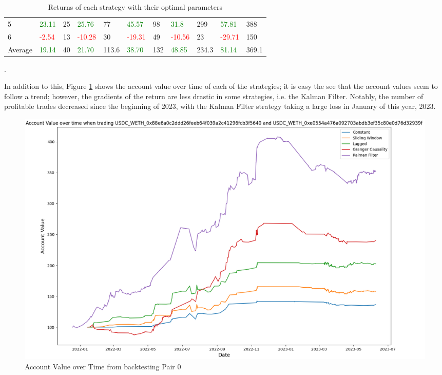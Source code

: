 \begin{table}[H]
\begin{adjustwidth}{-0.8in}{-0.9in}
\begin{tabular}{|p{4em}|p{3em}|p{3em}|p{3em}|p{3em}|p{3em}|p{3em}|p{3em}|p{3em}|p{3em}|p{3em}|}
            5 & \textcolor{green}{23.11} & 25 & \textcolor{green}{25.76} & 77 & \textcolor{green}{45.57} & 98 & \textcolor{green}{31.8} & 299 & \textcolor{green}{57.81} & 388\\\cline{2-11}
            6 & \textcolor{red}{-2.54} & 13 & \textcolor{red}{-10.28} & 30 & \textcolor{red}{-19.31} & 49 & \textcolor{red}{-10.56} & 23 & \textcolor{red}{-29.71} & 150\\\hline\hline           
            Average & \textcolor{green}{19.14} & 40 & \textcolor{green}{21.70} & 113.6 & \textcolor{green}{38.70} & 132 & \textcolor{green}{48.85} & 234.3 & \textcolor{green}{81.14} & 369.1\\\hline                       
        \end{tabular}
    \end{adjustwidth}
    \caption{Returns of each strategy with their optimal parameters \label{tab:FinalResults}}.
\end{table}

\noindent In addition to this, Figure \ref{fig:ValueHistory} shows the account value over time of each of the strategies; it is easy the see that the account values seem to follow a trend; however, the gradients of the return are less drastic in some strategies, i.e. the Kalman Filter. Notably, the number of profitable trades decreased since the beginning of 2023, with the Kalman Filter strategy taking a large loss in January of this year, 2023.

\begin{figure}[H]
    \centering
    \includegraphics[width=\linewidth]{evaluation/Images/ValueHistory.png}
    \caption{Account Value over Time from backtesting Pair 0}
    \label{fig:ValueHistory}
\end{figure}

